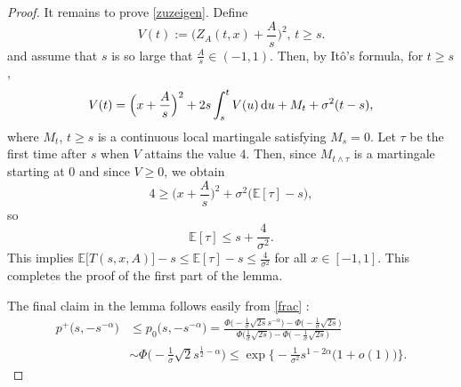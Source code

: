 \documentclass[10pt,a4paper]{amsart}
\def\E{\mathbb E}
\def\P{\mathbb P}
\renewcommand{\d}{\hbox{d}}
\begin{document}
\begin{proof}

It remains to prove \eqref{zuzeigen}. Define
$$
V(t):=\Big(Z_A(t,x)+\frac As\Big)^2,\,t \geq s.
$$
and assume that $s$ is so large that $\frac As \in (-1,1)$. Then, by It\^o's formula, for $t \geq s$,
$$
V(t)=\Big(x+\frac As\Big)^2+2s\int_s^t V(u)\,\d u+M_t+\sigma^2 (t-s),
$$
where $M_t$, $t \geq s$ is a continuous local martingale satisfying $M_s=0$. Let $\tau$ be the first time after $s$ when $V$ attains the value 4. Then, since $M_{t\wedge \tau}$ is a martingale starting at 0 and since $V \geq 0$, we obtain
$$
4 \geq \Big(x+\frac As\Big)^2 + \sigma^2 \Big(\E [\tau]-s\Big),
$$
so
$$
\E [\tau] \leq s+ \frac 4{\sigma^2}.  
$$
This implies $\E \big[T(s,x,A)\big]-s \leq \E [\tau]-s \leq \frac 4{\sigma^2}$ for all $x \in [-1,1]$. %
This completes the proof of the first part of the lemma.

The final claim in the lemma   follows easily from \eqref{frac} :
\begin{align*}
p^+\big(s,-s^{-\alpha}\big)&\leq p_0(s,-s^{-\alpha}\big)=\frac{\Phi\Big(-\frac1\sigma \sqrt{2s}s^{-\alpha}\Big)-\Phi\Big(-\frac1\sigma \sqrt{2s}\Big)}{\Phi\Big(\frac1\sigma \sqrt{2s}\Big)-\Phi\Big(-\frac1\sigma \sqrt{2s}\Big)}\\
&\sim  \Phi\Big(-\frac1\sigma \sqrt{2}s^{\frac 12-\alpha}\Big)  \leq\exp\Big\{-\frac 1{\sigma^2}s^{1-2\alpha}\big(1+o(1)\big)    \Big\}.
\end{align*}


\end{proof}
\end{document}
